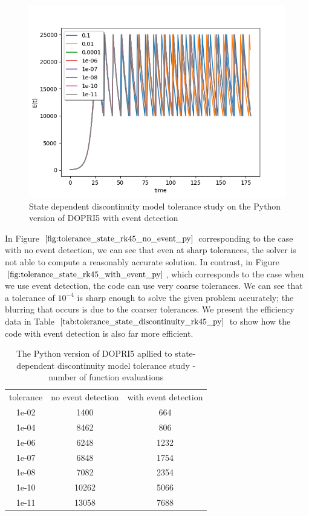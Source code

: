 \begin{figure}[h]
\centering
\includegraphics[width=0.7\linewidth]{./figures/tolerance_state_rk45_with_event_py}
\caption{State dependent discontinuity model tolerance study on the Python version of DOPRI5 with event detection}
\label{fig:tolerance_state_rk45_with_event_py}
\end{figure}

In Figure $\ref{fig:tolerance_state_rk45_no_event_py}$ corresponding to the case with no event detection, we can see that even at sharp tolerances, the solver is not able to compute a reasonably accurate solution. In contrast, in Figure $\ref{fig:tolerance_state_rk45_with_event_py}$, which corresponds to the case when we use event detection, the code can use very coarse tolerances. We can see that a tolerance of $10^{-4}$ is sharp enough to solve the given problem accurately; the blurring that occurs is due to the coarser tolerances. We present the efficiency data in Table $\ref{tab:tolerance_state_discontinuity_rk45_py}$ to show how the code with event detection is also far more efficient.

\begin{table}[h]
\caption {The Python version of DOPRI5 apllied to state-dependent discontinuity model tolerance study - number of function evaluations} \label{tab:tolerance_state_discontinuity_rk45_py} 
\begin{center}
\begin{tabular}{ c c c }
tolerance & no event detection & with event detection \\
1e-02 & 1400 & 664 \\
1e-04 & 8462 & 806 \\
1e-06 & 6248 & 1232 \\
1e-07 & 6848 & 1754 \\
1e-08 & 7082 & 2354 \\
1e-10 & 10262 & 5066 \\
1e-11 & 13058 & 7688 \\
\end{tabular}
\end{center}
\end{table}

